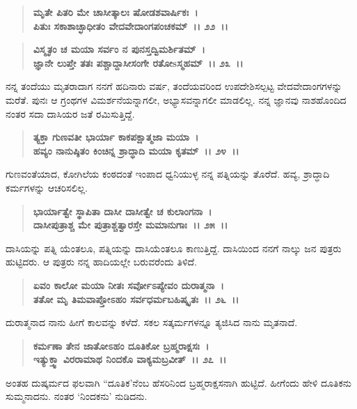 \begin{verse}
\textbf{ಮೃತೇ ಪಿತರಿ ಮೇ ಚಾಸೀತ್ಕಾಲಃ ಷೋಡಶವಾರ್ಷಿಕಃ~।}\\\textbf{ಪಿತುಃ ಸಕಾಶಾಚ್ಛಾಧೀತಂ ವೇದವೇದಾಂಗಪಂಚಕಮ್~।। ೨೨~।। }
\end{verse}

\begin{verse}
\textbf{ವಿಸ್ಮೃತಂ ಚ ಮಯಾ ಸರ್ವಂ ನ ಪುನಸ್ತದ್ವಿಮರ್ಶಿತಮ್~।}\\\textbf{ಜ್ಞಾನೇ ಲುಪ್ತೇ ತತಃ ಪಶ್ಚಾದ್ದಾಸೀಸಂಗೇ ರತೋsಸ್ಮಹಮ್~।। ೨೩~।।}
\end{verse}

ನನ್ನ ತಂದೆಯು ಮೃತರಾದಾಗ ನನಗೆ ಹದಿನಾರು ವರ್ಷ, ತಂದೆಯವರಿಂದ ಉಪದೇಶಿಸಲ್ಪಟ್ಟ ವೇದವೇದಾಂಗಗಳನ್ನು ಮರೆತೆ. ಪುನಃ ಆ ಗ್ರಂಥಗಳ ವಿಮರ್ಶನೆಯನ್ನಾಗಲೀ, ಅಭ್ಯಾಸವನ್ನಾಗಲೀ ಮಾಡಲಿಲ್ಲ. ನನ್ನ ಜ್ಞಾನವು ನಾಶಹೊಂದಿದ ನಂತರ ಸದಾ ದಾಸಿಯರ ಜತೆ ರಮಿಸುತ್ತಿದ್ದೆ.

\begin{verse}
\textbf{ತ್ಯಕ್ತಾ ಗುಣವತೀ ಭಾರ್ಯಾ ಕಾಕಪಕ್ಷಾತ್ಮಜಾ ಮಯಾ~।}\\\textbf{ಹವ್ಯಂ ನಾನುಷ್ಠಿತಂ ಕಿಂಚಿನ್ನ ಶ್ರಾದ್ಧಾದಿ ಮಯಾ ಕೃತಮ್~।। ೨೪~।।}
\end{verse}

ಗುಣವಂತೆಯಾದ, ಕೋಗಿಲೆಯ ಕಂಠದಂತೆ ಇಂಪಾದ ಧ್ವನಿಯುಳ್ಳ ನನ್ನ ಪತ್ನಿಯನ್ನು ತೊರೆದೆ. ಹವ್ಯ, ಶ್ರಾದ್ಧಾದಿ ಕರ್ಮಗಳನ್ನು ಆಚರಿಸಲಿಲ್ಲ.

\begin{verse}
\textbf{ಭಾರ್ಯಾತ್ವೇ ಸ್ಥಾಪಿತಾ ದಾಸೀ ದಾಸೀತ್ವೇ ಚ ಕುಲಾಂಗನಾ~।}\\\textbf{ದಾಸೀಪುತ್ರಾಶ್ಚ ಮೇ ಪುತ್ರಾಶ್ಚತ್ವಾರಸ್ತೇ ಮಮಾನುಗಾಃ~।। ೨೫~।।}
\end{verse}

ದಾಸಿಯನ್ನು ಪತ್ನಿ ಯೆಂತಲೂ, ಪತ್ನಿಯನ್ನು ದಾಸಿಯೆಂತಲೂ ಕಾಣುತ್ತಿದ್ದೆ. ದಾಸಿಯಿಂದ ನನಗೆ ನಾಲ್ಕು ಜನ ಪುತ್ರರು ಹುಟ್ಟಿದರು. ಆ ಪುತ್ರರು ನನ್ನ ಹಾದಿಯಲ್ಲೇ ಬರುವರೆಂದು ತಿಳಿದೆ.

\begin{verse}
\textbf{ಏವಂ ಕಾಲೋ ಮಯಾ ನೀತಃ ಸರ್ವೋಽಪ್ಯೇವಂ ದುರಾತ್ಮನಾ~।}\\\textbf{ತತೋ ಮೃ ತಿಮವಾಪ್ತೋಽಹಂ ಸರ್ವಧರ್ಮಬಹಿಷ್ಕೃತಃ~।। ೨೬~।।}
\end{verse}

ದುರಾತ್ಮನಾದ ನಾನು ಹೀಗೆ ಕಾಲವನ್ನು ಕಳೆದೆ. ಸಕಲ ಸತ್ಕರ್ಮಗಳನ್ನೂ ತ್ಯಜಿಸಿದ ನಾನು ಮೃತನಾದೆ.

\begin{verse}
\textbf{ಕರ್ಮಣಾ ತೇನ ಜಾತೋಽಹಂ ದೂತಿಕೋ ಬ್ರಹ್ಮರಾಕ್ಷಸಃ~।}\\\textbf{ಇತ್ಯುಕ್ತ್ವಾ ವಿರರಾಮಾಥ ನಿಂದಕೊ ವಾಕ್ಯಮಬ್ರವೀತ್~।। ೨೭~।।}
\end{verse}

ಅಂತಹ ದುಷ್ಕರ್ಮದ ಫಲವಾಗಿ “ದೂತಿಕ'ನೆಂಬ ಹೆಸರಿನಿಂದ ಬ್ರಹ್ಮರಾಕ್ಷಸನಾಗಿ ಹುಟ್ಟಿದೆ. ಹೀಗೆಂದು ಹೇಳಿ ದೂತಿಕನು ಸುಮ್ಮನಾದನು. ನಂತರ `ನಿಂದಕನು' ನುಡಿದನು.

